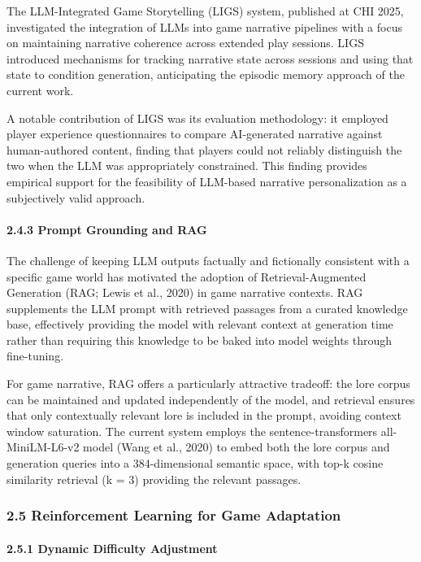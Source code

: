 The LLM-Integrated Game Storytelling (LIGS) system, published at CHI
2025, investigated the integration of LLMs into game narrative pipelines
with a focus on maintaining narrative coherence across extended play
sessions. LIGS introduced mechanisms for tracking narrative state across
sessions and using that state to condition generation, anticipating the
episodic memory approach of the current work.

A notable contribution of LIGS was its evaluation methodology: it
employed player experience questionnaires to compare AI-generated
narrative against human-authored content, finding that players could not
reliably distinguish the two when the LLM was appropriately constrained.
This finding provides empirical support for the feasibility of LLM-based
narrative personalization as a subjectively valid approach.

\paragraph{2.4.3 Prompt Grounding and
RAG}\label{prompt-grounding-and-rag}

The challenge of keeping LLM outputs factually and fictionally
consistent with a specific game world has motivated the adoption of
Retrieval-Augmented Generation (RAG; Lewis et al., 2020) in game
narrative contexts. RAG supplements the LLM prompt with retrieved
passages from a curated knowledge base, effectively providing the model
with relevant context at generation time rather than requiring this
knowledge to be baked into model weights through fine-tuning.

For game narrative, RAG offers a particularly attractive tradeoff: the
lore corpus can be maintained and updated independently of the model,
and retrieval ensures that only contextually relevant lore is included
in the prompt, avoiding context window saturation. The current system
employs the sentence-transformers all-MiniLM-L6-v2 model (Wang et al.,
2020) to embed both the lore corpus and generation queries into a
384-dimensional semantic space, with top-k cosine similarity retrieval
(k = 3) providing the relevant passages.

\subsubsection{2.5 Reinforcement Learning for Game
Adaptation}\label{reinforcement-learning-for-game-adaptation}

\paragraph{2.5.1 Dynamic Difficulty
Adjustment}\label{dynamic-difficulty-adjustment}

